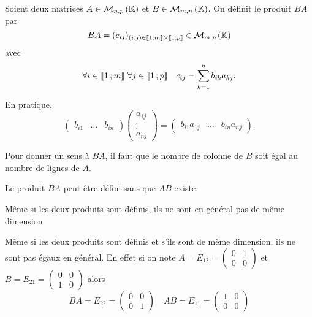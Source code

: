 \begin{defdef}
  Soient deux matrices \(A \in \mathcal{M}_{n,p}\left(\mathbb{K}\right)\) et \(B \in \mathcal{M}_{m,n}\left(\mathbb{K}\right)\). On 
  définit le produit \(BA\) par \begin{equation}
    BA=(c_{ij})_{(i,j)\in \mathopen{\llbracket}1\mathclose{}\mathpunct{};m\mathclose{\rrbracket} \times 
    \mathopen{\llbracket}1\mathclose{}\mathpunct{};p\mathclose{\rrbracket}} \in \mathcal{M}_{m,p}\left(\mathbb{K}\right)
  \end{equation}
  avec
  \begin{equation}
    \forall i \in \mathopen{\llbracket}1\mathclose{}\mathpunct{};m\mathclose{\rrbracket} \ \forall j \in 
    \mathopen{\llbracket}1\mathclose{}\mathpunct{};p\mathclose{\rrbracket} \quad c_{ij}=\sum_{k=1}^n b_{ik}a_{kj}.
  \end{equation}

  En pratique,
  \begin{equation}
    \begin{pmatrix} b_{i1} & \ldots & b_{in} \end{pmatrix} \begin{pmatrix} 
      a_{1j} \\ \vdots \\ a_{nj} \end{pmatrix} = \begin{pmatrix} b_{i1}a_{1j} & 
  \ldots & b_{in}a_{nj}\end{pmatrix}.
\end{equation}
\end{defdef}

\danger Pour donner un sens à \(BA\), il faut que le nombre de colonne de \(B\) 
soit égal au nombre de lignes de \(A\).

\danger Le produit \(BA\) peut être défini sans que \(AB\) existe.

\danger Même si les deux produits sont définis, ils ne sont en général pas de 
même dimension.

\danger Même si les deux produits sont définis et s'ils sont de même dimension, 
ils ne sont pas égaux en général. En effet si on note \(A=E_{12}=\begin{pmatrix} 
  0 & 1 \\ 0 & 0 \end{pmatrix}\) et \(B=E_{21}=\begin{pmatrix} 0 & 0 \\ 1 & 0 
\end{pmatrix}\) alors
\begin{equation}
  BA = E_{22} = \begin{pmatrix} 0 & 0 \\ 0 & 1 \end{pmatrix} \quad AB = E_{11} = 
    \begin{pmatrix} 1 & 0 \\ 0 & 0 \end{pmatrix}
\end{equation}


